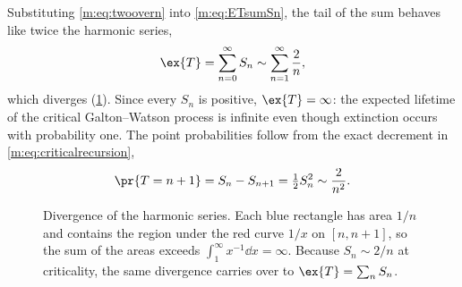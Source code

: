Substituting \cref{m:eq:twoovern} into \cref{m:eq:ETsumSn}, the tail
of the sum behaves like twice the harmonic series,
\begin{equation*}
\ex{T} = \sum_{n=0}^{\infty}S_n \sim \sum_{n=1}^{\infty}\frac{2}{n},
\end{equation*}
which diverges (\cref{m:fig:harmonic}). Since every $S_n$ is positive,
$\ex{T}=\infty$: the expected lifetime of the critical Galton--Watson process is
infinite even though extinction occurs with probability one. The point
probabilities follow from the exact decrement in \cref{m:eq:criticalrecursion},
\begin{equation}
\label{m:eq:criticalTtail}
\pr{T = n+1} = S_n-S_{n+1} = \tfrac12S_n^2 \sim \frac{2}{n^2} .
\end{equation}

\begin{figure}[H]
    \centering
{}
\caption{Divergence of the harmonic series. Each blue rectangle has area $1/n$ and
contains the region under the red curve $1/x$ on $[n,n+1]$, so the sum of the areas
exceeds $\int_1^\infty x^{-1}\dd x=\infty$. Because $S_n\sim2/n$ at criticality,
the same divergence carries over to $\ex{T}=\sum_nS_n$.}
\label{m:fig:harmonic}
\end{figure}

